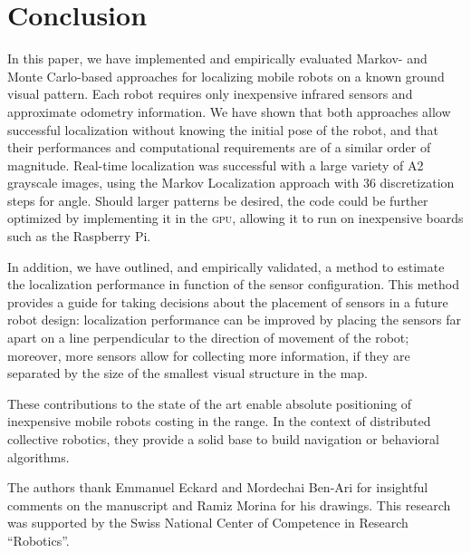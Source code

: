 \documentclass{svmult}
\begin{document}
\section{Conclusion}

In this paper, we have implemented and empirically evaluated Markov- and Monte Carlo-based approaches for localizing mobile robots on a known ground visual pattern.
Each robot requires only inexpensive infrared sensors and approximate odometry information.
We have shown that both approaches allow successful localization without knowing the initial pose of the robot, and that their performances and computational requirements are of a similar order of magnitude.
Real-time localization was successful with a large variety of A2 grayscale images, using the Markov Localization approach with 36 discretization steps for angle.
Should larger patterns be desired, the code could be further optimized by implementing it in the \textsc{gpu}, allowing it to run on inexpensive boards such as the Raspberry Pi.

In addition, we have outlined, and empirically validated, a method to estimate the localization performance in function of the sensor configuration.
This method provides a guide for taking decisions about the placement of sensors in a future robot design:
localization performance can be improved by placing the sensors far apart on a line perpendicular to the direction of movement of the robot; moreover, more sensors allow for collecting more information, if they are separated by the size of the smallest visual structure in the map.

These contributions to the state of the art enable absolute positioning of inexpensive mobile robots costing in the  range.
In the context of distributed collective robotics, they provide a solid base to build navigation or behavioral algorithms.

\begin{acknowledgement}
The authors thank Emmanuel Eckard and Mordechai Ben-Ari for insightful comments on the manuscript and Ramiz Morina for his drawings.
This research was supported by the Swiss National Center of Competence in Research ``Robotics''.
\end{acknowledgement}



\end{document}
